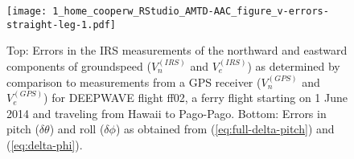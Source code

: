 \documentclass[english,british,amtd,bookmarks=false,unicode=true]{copernicus}\usepackage[]{graphicx}\usepackage[]{color}
\begin{document}
\begin{center}
\begin{figure}
\begin{centering}
\texttt{[image: 1\_home\_cooperw\_RStudio\_AMTD-AAC\_figure\_v-errors-straight-leg-1.pdf]}
\par\end{centering}

\caption{Top: Errors in the IRS measurements of the northward and eastward components of groundspeed ($V_n^{(IRS)}$ and $V_e^{(IRS)}$) as determined by comparison to measurements from a GPS receiver ($V_n^{(GPS)}$ and $V_e^{(GPS)}$) for DEEPWAVE flight ff02, a ferry flight starting on 1 June 2014 and traveling from Hawaii to Pago-Pago. Bottom: Errors in pitch ($\delta\theta$) and roll ($\delta\phi$) as obtained from (\ref{eq:full-delta-pitch}) and (\ref{eq:delta-phi}).\label{fig:v-errors-straight-leg}}
\end{figure}

\par\end{center}
\end{document}
